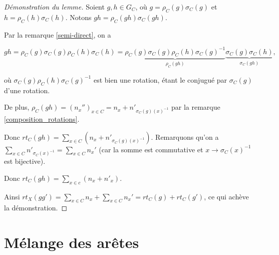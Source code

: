 \documentclass[french]{report}
\begin{document}
\begin{proof}[Démonstration du lemme]
  Soient $g, h \in G_C$, où $g = \rho_C(g) \sigma_C(g) $ et $h = \rho_C(h)\sigma_C(h)$. Notons $gh = \rho_C(gh) \sigma_C(gh)$.

  Par la remarque \ref{semi-direct}, on a

  \begin{equation*}
    gh = \rho_C(g) \sigma_C(g) \rho_C(h) \sigma_C(h) = \underbrace{\rho_C(g) \sigma_C(g) \rho_C(h) \sigma_C(g) ^{-1} }_{\rho_C(gh)} \underbrace{\sigma_C(g) \sigma_C(h)}_{\sigma_C(gh)},
  \end{equation*}

  où $\sigma_C(g) \rho_C(h) \sigma_C(g) ^{-1}$ est bien une rotation, étant le conjugué par $\sigma_C(g)$ d'une rotation.

  De plus, $\rho_C(gh) = (n_x'') _{x \in C} = n_x + n' _{\sigma_C(g)(x) ^{-1} }$ par la remarque \ref{composition_rotations}.

  Donc $rt_C(gh) = \sum_{x \in C}^{} (n_x + n'_{\sigma_C(g)(x) ^{-1} }) $. Remarquons qu'on a $\sum_{x \in C} n' _{\sigma_C(x) ^{-1} } = \sum_{x \in C} n_x' $ (car la somme est commutative et $x \to \sigma_C(x)^{-1} $ est bijective).

  Donc $rt_C(g h) = \sum_{x \in c} (n_x + n' _{x}) $.

  Ainsi $rt_X(gg') = \sum_{x \in C} n_x+ \sum_{x \in C} n_x' = rt_C(g)+ rt_C(g')  $,  ce qui achève la démonstration.





\end{proof}

\section{Mélange des arêtes}
\end{document}
